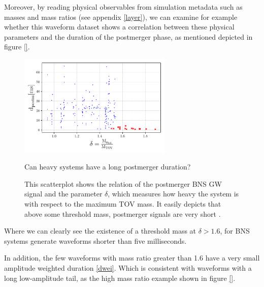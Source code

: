 \FloatBarrier 


Moreover, by reading physical observables from simulation metadata such as masses and mass ratios (see appendix \ref{layer}), we can examine for example whether this waveform dataset shows a correlation between these physical parameters and the duration of the postmerger phase, as mentioned depicted in figure \ref{}. 

\begin{figure}[hbt!]
\begin{center}
\includegraphics[width=0.65\textwidth, angle=0]{images/Data_analysis/results/res0.pdf}
\captionsetup{width=0.8\textwidth}
\caption{Can heavy systems have a long postmerger duration?}
\caption*{This scatterplot shows the relation of the postmerger BNS GW signal and the parameter $\delta$, which measures how heavy the system is with respect to the maximum TOV mass. It easily depicts that above some threshold mass, postmerger signals are very short \cite{Kashyap_2022}.}
\label{heavy systems}
\end{center}
\end{figure}
\FloatBarrier

Where we can clearly see the existence of a threshold mass at $\delta> 1.6$, for BNS systems generate waveforms shorter than five milliseconds.

In addition, the few waveforms with mass ratio greater than 1.6 have a very small amplitude weighted duration \ref{dwei}. Which is consistent with waveforms with a long low-amplitude tail, as the high mass ratio example shown in figure \ref{}.


